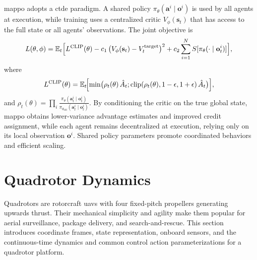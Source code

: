 \subsection{}
\gls{mappo} \cite{yu_surprising_2022} adopts a \gls{ctde} paradigm. A shared policy \(\pi_\theta(\mathbf{a}^i\mid \mathbf{o}^i)\) is used by all agents at execution, while training uses a centralized critic \(V_\phi(\mathbf{s}_t)\) that has access to the full state or all agents' observations. The joint objective is
\begin{equation}
L(\theta,\phi) = \mathbb{E}_t\Bigl[L^{\mathrm{CLIP}}(\theta)
  - c_1\,\bigl(V_\phi(\mathbf{s}_t)-V^{\text{target}}_t\bigr)^2
  + c_2 \sum_{i=1}^N S[\pi_\theta(\cdot\mid \mathbf{o}^i_t)]\Bigr],
\end{equation}
where 
\begin{equation}
L^{\mathrm{CLIP}}(\theta) = \mathbb{E}_t\!\Bigl[\min\bigl(\rho_t(\theta)\,\hat{A}_t;\text{clip}(\rho_t(\theta),1-\epsilon,1+\epsilon)\,\hat{A}_t\bigr)\Bigr],
\end{equation}
and \(\rho_t(\theta)=\prod_i \frac{\pi_\theta(\mathbf{a}^i_t\mid \mathbf{o}^i_t)}{\pi_{\theta_{\text{old}}}(\mathbf{a}^i_t\mid \mathbf{o}^i_t)}\). By conditioning the critic on the true global state, \gls{mappo} obtains lower-variance advantage estimates and improved credit assignment, while each agent remains decentralized at execution, relying only on its local observation \(\mathbf{o}^i\). Shared policy parameters promote coordinated behaviors and efficient scaling.

\section{Quadrotor Dynamics}
\label{sec:quadrotor_control}
Quadrotors are rotorcraft \glspl{uav} with four fixed-pitch propellers generating upwards thrust. Their mechanical simplicity and agility make them popular for aerial surveillance, package delivery, and search-and-rescue. This section introduces coordinate frames, state representation, onboard sensors, and the continuous-time dynamics and common control action parameterizations for a quadrotor platform.


